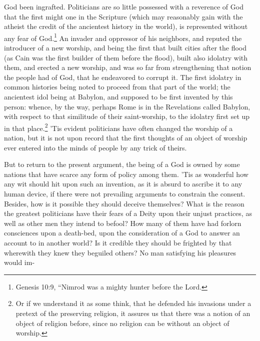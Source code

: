 \documentclass[a5paper]{book}
\begin{document}
God been ingrafted. Politicians are so little possessed with a 
reverence of God that the first might one in the Scripture (which may
reasonably gain with the atheist the credit of the ancientest history
in the world), is represented without any fear of God.\footnote{Genesis 10:9, 
    ``Nimrod was a mighty hunter before the Lord.}
An invader and oppressor of his neighbors, and reputed the introducer of a new
worship, and being the first that built cities after the flood (as Cain
was the first builder of them before the flood), built also idolatry
with them, and erected a new worship, and was so far from 
strengthening that notion the people had of God, that he endeavored to 
corrupt it. The first idolatry in common histories being noted to
proceed from that part of the world; the ancientest idol being at
Babylon, and supposed to be first invented by this person: whence,
by the way, perhaps Rome is in the Revelations called Babylon, with
respect to that similitude of their saint-worship, to the idolatry first
set up in that place.\footnote{Or if we understand it as some think, 
    that he defended his invasions under a pretext of the preserving religion,
    it assures us that there was a notion of an object of religion before, 
    since no religion can be without an object of worship.}
’Tis evident politicians have often changed the worship of a nation, 
but it is not upon record that the first thoughts of an object of worship 
ever entered into the minds of people by any trick of theirs.

But to return to the present argument, the being of a God is
owned by some nations that have scarce any form of policy among
them. 'Tis as wonderful how any wit should hit upon such an
invention, as it is absurd to ascribe it to any human device, if there
were not prevailing arguments to constrain the consent. Besides,
how is it possible they should deceive themselves? What is the
reason the greatest politicians have their fears of a Deity upon their
unjust practices, as well as other men they intend to befool? How
many of them have had forlorn consciences upon a death-bed, upon
the consideration of a God to answer an account to in another world?
Is it credible they should be frighted by that wherewith they knew
they beguiled others? No man satisfying his pleasures would im-
\end{document}
